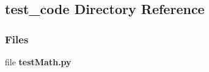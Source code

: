 \subsection{test\+\_\+code Directory Reference}
\label{dir_c5c299569ede35187292ca4fb0972402}
\subsubsection*{Files}
\begin{DoxyCompactItemize}
\item 
file \textbf{ test\+Math.\+py}
\end{DoxyCompactItemize}
